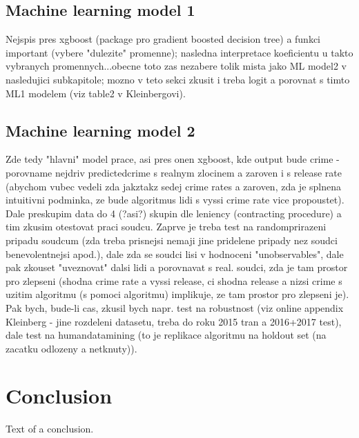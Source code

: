 \documentclass[12pt, twoside]{book} %
\begin{document}
\section{Machine learning model 1}   %

Nejspis pres xgboost (package pro gradient boosted decision tree) a funkci important (vybere "dulezite" promenne); nasledna interpretace koeficientu u takto vybranych promennych...obecne toto zas nezabere tolik mista jako ML model2 v nasledujici subkapitole; mozno v teto sekci zkusit i treba logit a porovnat s timto ML1 modelem (viz table2 v Kleinbergovi).


\section{Machine learning model 2}     %

Zde tedy "hlavni" model prace, asi pres onen xgboost, kde output bude crime - porovname nejdriv predictedcrime s realnym zlocinem a zaroven i s release rate (abychom vubec vedeli zda jakztakz sedej crime rates a zaroven, zda je splnena intuitivni podminka, ze bude algoritmus lidi s vyssi crime rate vice propoustet). Dale preskupim data do 4 (?asi?) skupin dle leniency (contracting procedure) a tim zkusim otestovat praci soudcu. Zaprve je treba test na randomprirazeni pripadu soudcum (zda treba prisnejsi nemaji jine pridelene pripady nez soudci benevolentnejsi apod.), dale zda se soudci lisi v hodnoceni "unobservables", dale pak zkouset "uveznovat" dalsi lidi a porovnavat s real. soudci, zda je tam prostor pro zlepseni (shodna crime rate a vyssi release, ci shodna release a nizsi crime s uzitim algoritmu (s pomoci algoritmu) implikuje, ze tam prostor pro zlepseni je).\newline
Pak bych, bude-li cas, zkusil bych napr. test na robustnost (viz online appendix Kleinberg - jine rozdeleni datasetu, treba do roku 2015 tran a 2016+2017 test), dale test na humandatamining (to je replikace algoritmu na holdout set (na zacatku odlozeny a netknuty)).





\chapter*{Conclusion}          %

Text of a conclusion.




\end{document}
